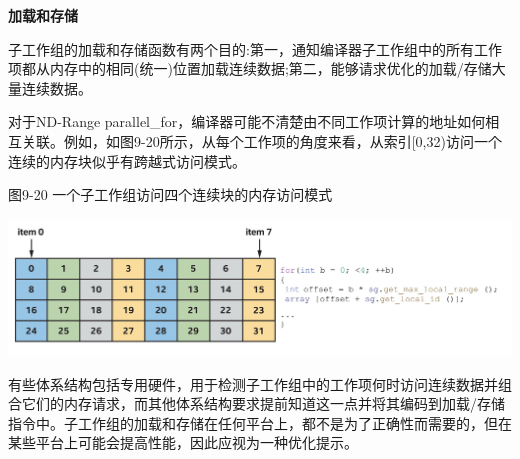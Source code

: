 \hspace*{\fill} \par %
\textbf{加载和存储}

子工作组的加载和存储函数有两个目的:第一，通知编译器子工作组中的所有工作项都从内存中的相同(统一)位置加载连续数据;第二，能够请求优化的加载/存储大量连续数据。\par

对于ND-Range parallel\_for，编译器可能不清楚由不同工作项计算的地址如何相互关联。例如，如图9-20所示，从每个工作项的角度来看，从索引[0,32)访问一个连续的内存块似乎有跨越式访问模式。\par

\hspace*{\fill} \par %
图9-20 一个子工作组访问四个连续块的内存访问模式
\begin{center}
	\includegraphics[width=1.\textwidth]{content/chapter-9/images/13}
\end{center}

有些体系结构包括专用硬件，用于检测子工作组中的工作项何时访问连续数据并组合它们的内存请求，而其他体系结构要求提前知道这一点并将其编码到加载/存储指令中。子工作组的加载和存储在任何平台上，都不是为了正确性而需要的，但在某些平台上可能会提高性能，因此应视为一种优化提示。\par

































